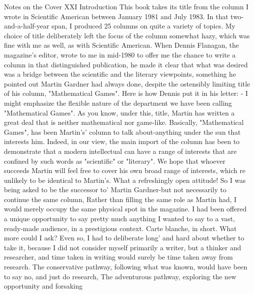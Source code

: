 Notes on the Cover                                                                 XXI Introduction 
This book takes its title from the column I wrote in Scientific American between January 1981 and July 1983. In that two-and-a-half-year span, I produced 25 columns on quite a variety of topics. My choice of title deliberately left the focus of the column somewhat hazy, which was fine with me as well, as with Scientific American. When Dennis Flanagan, the magazine's editor, wrote to me in mid-1980 to offer me the chance to write a column in that distinguished publication, he made it clear that what was desired was a bridge between the scientific and the literary viewpoints, something he pointed out Martin Gardner had always done, despite the ostensibly limiting title of his column, "Mathematical Games". Here is how Dennis put it in his letter: - 
I might emphasize the flexible nature of the department we have been calling "Mathematical Games". As you know, under this, title, Martin has written a great deal that is neither mathematical nor game-like. Basically, "Mathematical Games", has been Martin's' column to talk about-anything under the sun that interests him. Indeed, in our view, the main import of the column has been to demonstrate that a modern intellectual can have a range of interests that are confined by such words as "scientific" or "literary". We hope that whoever succeeds Martin will feel free to cover his own broad range of interests, which re unlikely to be identical to Martin's. 
What a refreshingly open attitude! So I was being asked to be the successor to' Martin Gardner-but not necessarily to continue the same column, Rather than filling the same role as Martin had, I would merely occupy the same physical spot in the magazine. I had been offered a unique opportunity to say pretty much anything I wanted to say to a vast, ready-made audience, in a prestigious context. Carte blanche, in short. What more could I ask? Even so, I had to deliberate long' and hard about whether to take it, because I did not consider myself primarily a writer, but a thinker and researcher, and time taken in writing would surely be time taken away from research. The conservative pathway, following what was known, would have been to say no, and just do research, The adventurous pathway, exploring the new opportunity and forsaking 



